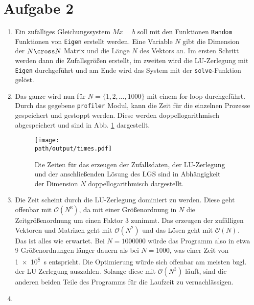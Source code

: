 \section*{Aufgabe 2}

\begin{enumerate}[label=\alph*)]
    \item Ein zufälliges Gleichungssystem $Mx = b$ soll mit den Funktionen \texttt{Random} Funktionen von \texttt{Eigen} erstellt werden. 
    Eine Variable $N$ gibt die Dimension der $N \cross N$ Matrix und die Länge $N$ des Vektors an.
    Im ersten Schritt werden dann die Zufallsgrößen erstellt, im zweiten wird die LU-Zerlegung mit \texttt{Eigen} durchgeführt und am Ende wird das System mit der \texttt{solve}-Funktion gelöst.
    \item Das ganze wird nun für $N = \{1, 2, \dots, 1000\}$ mit einem for-loop durchgeführt. Durch das gegebene \texttt{profiler} Modul, kann die Zeit für die einzelnen Prozesse gespeichert und gestoppt werden. 
    Diese werden doppellogarithmisch abgespeichert und sind in Abb. \ref{fig:times} dargestellt.

    \begin{figure}
        \centering
        \texttt{[image: \\path/output/times.pdf]}
        \caption{Die Zeiten für das erzeugen der Zufallsdaten, der LU-Zerlegung und der anschließenden Lösung des LGS sind in Abhängigkeit der Dimension $N$ doppellogarithmisch dargestellt.}
        \label{fig:times}
    \end{figure}
    \item Die Zeit scheint durch die LU-Zerlegung dominiert zu werden. Diese geht offenbar mit $\mathcal{O}(N^3)$, da mit einer Größenordnung in $N$ die Zeitgrößenordnung um einen Faktor \num{3} zunimmt. Das erzeugen der zufälligen Vektoren und Matrizen geht mit $\mathcal{O}(N^2)$ und das Lösen geht mit $\mathcal{O}(N)$. Das ist alles wie erwartet.
    Bei $N = \num{1000000}$ würde das Programm also in etwa \num{9} Größenordnungen länger dauern als bei $N=\num{1000}$, was einer Zeit von \SI{1e8}{\second} entspricht. 
    Die Optimierung würde sich offenbar am meisten bzgl. der LU-Zerlegung auszahlen. Solange diese mit $\mathcal{O}(N^3)$ läuft, sind die anderen beiden Teile des Programms für die Laufzeit zu vernachlässigen.
    \item 
\end{enumerate}